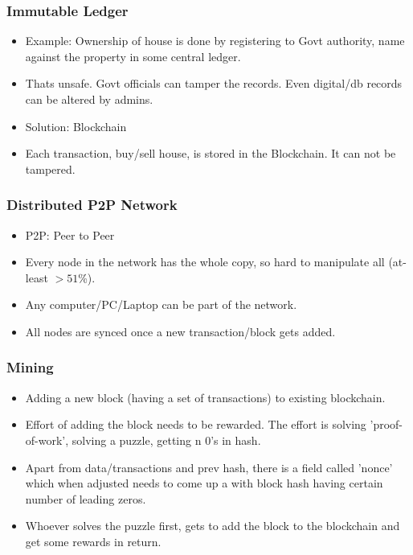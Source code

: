 \begin{frame}[fragile]\frametitle{Immutable Ledger}
\begin{itemize}
\item Example: Ownership of house is done by registering to Govt authority, name against the property in some central ledger.
\item Thats unsafe. Govt officials can tamper the records. Even digital/db records can be altered by admins.
\item Solution: Blockchain
\item Each transaction, buy/sell house, is stored in the Blockchain. It can not be tampered.
\end{itemize}

\end{frame}

\begin{frame}[fragile]\frametitle{Distributed P2P Network}
\begin{itemize}
\item P2P: Peer to Peer
\item Every node in the network has the whole copy, so hard to manipulate all (at-least $> 51$\%).
\item Any computer/PC/Laptop can be part of the network.
\item All nodes are synced once a new transaction/block gets added.
\end{itemize}

\end{frame}

\begin{frame}[fragile]\frametitle{Mining}
\begin{itemize}
\item Adding a new block (having a set of transactions) to existing blockchain.
\item Effort of adding the block needs to be rewarded. The effort is solving 'proof-of-work', solving a puzzle, getting n 0's in hash.
\item Apart from data/transactions and prev hash, there is a field called 'nonce' which when adjusted needs to come up a with block hash having certain number of leading zeros.
\item Whoever solves the puzzle first, gets to add the block to the blockchain and get some rewards in return.
\end{itemize}

\end{frame}

